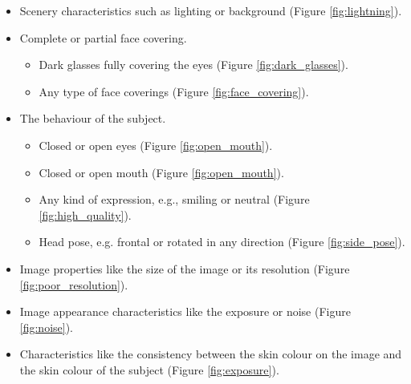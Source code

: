 \begin{itemize}
    \item Scenery characteristics such as lighting or background (Figure \ref{fig:lightning}).
    \item Complete or partial face covering.
    \begin{itemize}
        \item Dark glasses fully covering the eyes (Figure \ref{fig:dark_glasses}).
        \item Any type of face coverings (Figure \ref{fig:face_covering}).
    \end{itemize}
    \item The behaviour of the subject.
    \begin{itemize}
        \item Closed or open eyes (Figure \ref{fig:open_mouth}).
        \item Closed or open mouth (Figure \ref{fig:open_mouth}).
        \item Any kind of expression, e.g., smiling or neutral (Figure \ref{fig:high_quality}).
        \item Head pose, e.g. frontal or rotated in any direction (Figure \ref{fig:side_pose}).
    \end{itemize}
    \item Image properties like the size of the image or its resolution (Figure \ref{fig:poor_resolution}).
    \item Image appearance characteristics like the exposure or noise (Figure \ref{fig:noise}).
    \item Characteristics like the consistency between the skin colour on the image and the skin colour of the subject (Figure \ref{fig:exposure}).
\end{itemize}

